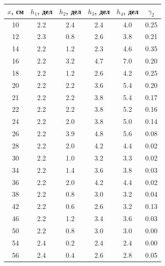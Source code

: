 \documentclass[a4paper,12pt]{article}
\begin{document}
\begin{table}[h]
\begin{tabular}{|c|c|c|c|c|c|}
\hline
$x$, см & $h_1$, дел & $h_2$, дел & $h_3$, дел & $h_4$, дел & $\gamma_2$ \\ \hline
10      & 2.2        & 2.4        & 2.4        & 4.0        & 0.25       \\ \hline
12      & 2.3        & 0.8        & 2.6        & 3.8        & 0.21       \\ \hline
14      & 2.2        & 1.2        & 2.3        & 4.6        & 0.35       \\ \hline
16      & 2.2        & 3.2        & 4.7        & 7.0        & 0.20       \\ \hline
18      & 2.2        & 1.2        & 2.6        & 4.2        & 0.25       \\ \hline
20      & 2.2        & 2.2        & 3.6        & 5.4        & 0.20       \\ \hline
21      & 2.2        & 2.2        & 3.8        & 5.4        & 0.17       \\ \hline
22      & 2.2        & 2.2        & 3.8        & 5.2        & 0.16       \\ \hline
24      & 2.2        & 2.0        & 3.8        & 5.0        & 0.14       \\ \hline
26      & 2.2        & 3.9        & 4.8        & 5.6        & 0.08       \\ \hline
28      & 2.2        & 2.0        & 4.2        & 4.4        & 0.02       \\ \hline
30      & 2.2        & 1.0        & 3.2        & 3.3        & 0.02       \\ \hline
34      & 2.2        & 1.4        & 3.6        & 3.8        & 0.03       \\ \hline
36      & 2.2        & 2.0        & 4.2        & 4.4        & 0.02       \\ \hline
38      & 2.2        & 0.8        & 3.0        & 3.2        & 0.04       \\ \hline
42      & 2.2        & 0.6        & 2.6        & 3.2        & 0.13       \\ \hline
46      & 2.2        & 1.2        & 3.4        & 3.6        & 0.03       \\ \hline
50      & 2.2        & 0.8        & 3.0        & 3.0        & 0.00       \\ \hline
54      & 2.4        & 0.2        & 2.4        & 2.4        & 0.00       \\ \hline
56      & 2.4        & 0.4        & 2.6        & 2.8        & 0.05       \\ \hline

\end{tabular}
\end{table}
\end{document}
